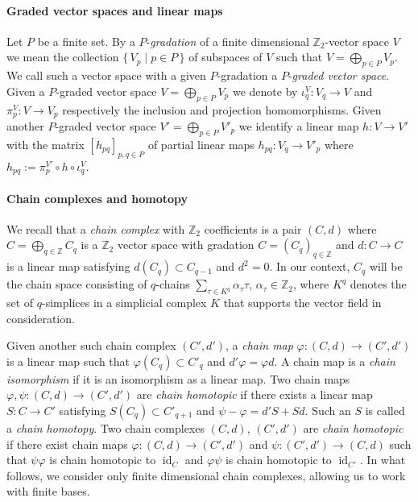 \documentclass[a4paper,english,cleveref]{article}
\theoremstyle{plain}
\newcommand{\id}{\operatorname{id}}
\def\mathobj#1{\mbox{$#1$}}
\def\ZZ{\mathobj{\mathbb{Z}}}
\def\setof#1{\mbox{$\{\,#1\,\}$}}
\newcounter{li}
\begin{document}
\paragraph{Graded vector spaces and linear maps} Let $P$ be a finite set.
By a $P$-{\em gradation} of a finite dimensional $\ZZ_2$-vector space $V$ we mean 
the collection $\setof{V_p\mid p\in P}$ of subspaces of $V$ such that $V=\bigoplus_{p\in P}V_p$.
We call such a vector space with a given $P$-gradation a $P$-{\em graded vector space}.
Given a $P$-graded vector space $V=\bigoplus_{p\in P}V_p$ 
we denote by $\iota^V_{q}:V_q\to V$ and $\pi^V_{p}:V\to V_p$ respectively the inclusion and projection homomorphisms.
Given another $P$-graded vector space $V'=\bigoplus_{p\in P}V'_p$ 
we identify a linear map $h:V\to V'$ with the matrix $[h_{pq}]_{p,q\in P}$ of partial linear maps
$h_{pq}:V_q\to V'_p$ where $h_{pq}:= \pi^{V'}_p\circ h\circ \iota^V_q$.

\paragraph{Chain complexes and homotopy}
We recall that a {\em chain complex} with $\ZZ_2$ coefficients is a pair $(C,d)$ where $C=\bigoplus_{q\in\ZZ}C_q$
is a $\ZZ_2$ vector space with gradation $C=(C_q)_{q\in \mathbb{Z}}$ 
and $d:C\to C$ is a linear map satisfying $d(C_q)\subset C_{q-1}$ and $d^2=0$.
In our context, $C_q$ will be the chain space consisting of $q$-chains
$\sum_{\tau\in K^q}\alpha_{\tau}\tau$, $\alpha_\tau\in \ZZ_2$,
where $K^q$ denotes the set of $q$-simplices
in a simplicial complex $K$ that supports the vector field
in consideration.

Given another such chain complex $(C',d')$, a {\em chain map} $\varphi:(C,d)\to(C',d')$ is a linear map such that 
$\varphi(C_q)\subset C'_q$ and $d'\varphi=\varphi d$.
A chain map is a {\em chain isomorphism} if it is an isomorphism as a linear map. 
Two chain maps $\varphi,\psi:(C,d)\to(C',d')$ are {\em chain homotopic} if there exists a linear map $S: C\to C'$
satisfying $S(C_q)\subset C'_{q+1}$ and $\psi-\varphi=d' S+S d$. Such an $S$ is called a {\em chain homotopy}.
Two chain complexes $(C,d)$, $(C',d')$ are {\em chain homotopic} if there exist chain maps $\varphi:(C,d)\to(C',d')$
and $\psi:(C',d')\to(C,d)$ such that $\psi\varphi$ is chain homotopic to $\id_C$ and $\varphi\psi$ is chain homotopic to $\id_{C'}$.
In what follows, we consider only finite dimensional chain complexes, allowing
us to work with finite bases.
\end{document}
